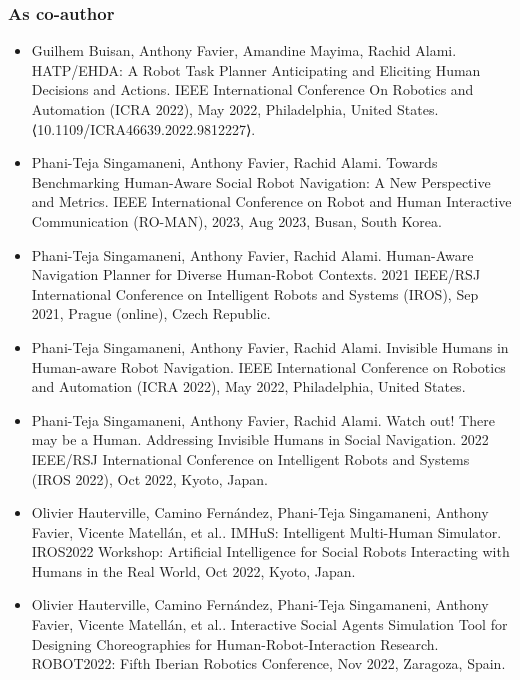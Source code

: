 \subsubsection*{As co-author}
\begin{itemize}
    
    \item Guilhem Buisan, Anthony Favier, Amandine Mayima, Rachid Alami. HATP/EHDA: A Robot Task Planner Anticipating and Eliciting Human Decisions and Actions. IEEE International Conference On Robotics and Automation (ICRA 2022), May 2022, Philadelphia, United States. ⟨10.1109/ICRA46639.2022.9812227⟩. 
    
    \item Phani-Teja Singamaneni, Anthony Favier, Rachid Alami. Towards Benchmarking Human-Aware Social Robot Navigation: A New Perspective and Metrics. IEEE International Conference on Robot and Human Interactive Communication (RO-MAN), 2023, Aug 2023, Busan, South Korea.
    \item Phani-Teja Singamaneni, Anthony Favier, Rachid Alami. Human-Aware Navigation Planner for Diverse Human-Robot Contexts. 2021 IEEE/RSJ International Conference on Intelligent Robots and Systems (IROS), Sep 2021, Prague (online), Czech Republic. 
    \item Phani-Teja Singamaneni, Anthony Favier, Rachid Alami. Invisible Humans in Human-aware Robot Navigation. IEEE International Conference on Robotics and Automation (ICRA 2022), May 2022, Philadelphia, United States.
    \item Phani-Teja Singamaneni, Anthony Favier, Rachid Alami. Watch out! There may be a Human. Addressing Invisible Humans in Social Navigation. 2022 IEEE/RSJ International Conference on Intelligent Robots and Systems (IROS 2022), Oct 2022, Kyoto, Japan. 

    \item Olivier Hauterville, Camino Fernández, Phani-Teja Singamaneni, Anthony Favier, Vicente Matellán, et al.. IMHuS: Intelligent Multi-Human Simulator. IROS2022 Workshop: Artificial Intelligence for Social Robots Interacting with Humans in the Real World, Oct 2022, Kyoto, Japan. 
    \item Olivier Hauterville, Camino Fernández, Phani-Teja Singamaneni, Anthony Favier, Vicente Matellán, et al.. Interactive Social Agents Simulation Tool for Designing Choreographies for Human-Robot-Interaction Research. ROBOT2022: Fifth Iberian Robotics Conference, Nov 2022, Zaragoza, Spain. 
\end{itemize}
    
    
    